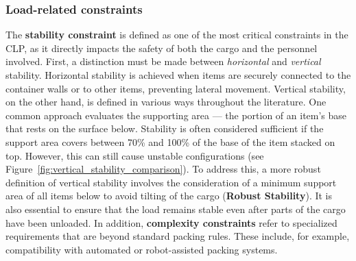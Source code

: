 \subsubsection{Load-related constraints}

The \textbf{stability constraint} is defined as one of the most critical constraints
in the \gls{CLP}, as it directly impacts
the safety of both the cargo and the personnel involved. First, a distinction
must be made between \textit{horizontal} and \textit{vertical} stability.
Horizontal stability is achieved when items are securely connected to the
container walls or to other items, preventing lateral movement. Vertical
stability, on the other hand, is defined in various ways throughout the
literature. One common approach evaluates the supporting area — the portion
of an item's base that rests on the surface below. Stability is often
considered sufficient if the support area covers between 70\% and 100\% of the base
of the item stacked on top. However, this can still cause unstable
configurations (see Figure~\ref{fig:vertical_stability_comparison}). To address this,
a more robust definition of vertical stability involves the consideration of a minimum support area
of all items below to avoid tilting of the cargo (\textbf{Robust Stability}). It is also essential to
ensure that the load remains stable even after parts of the cargo have been
unloaded. In addition, \textbf{complexity constraints} refer to specialized
requirements that are beyond standard packing rules. These include,
for example, compatibility with automated or robot-assisted packing systems.

